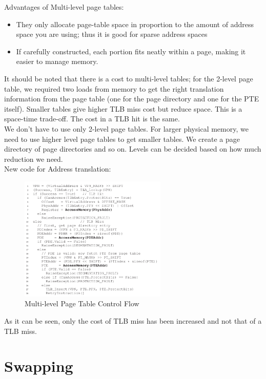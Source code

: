 Advantages of Multi-level page tables:

\begin{itemize}
    \item They only allocate page-table space in proportion to the amount of
        address space you are using; thus it is good for sparse address
        spaces
    \item If carefully constructed, each portion fits neatly within a page,
        making it easier to manage memory.
\end{itemize}

It should be noted that there is a cost to multi-level tables; for the
2-level page table, we required two loads from memory to get the right
translation information from the page table (one for the page directory and
one for the PTE itself). Smaller tables 
give higher TLB miss cost but reduce space.
This is a space-time trade-off. The cost in a TLB hit is the same.\\

We don't have to use only 2-level page tables. For larger physical memory, 
we need to use higher level page tables to get smaller tables. We create a
page directory of page directories and so on. Levels can be decided based on
how much reduction we need.\\

New code for Address translation:

\begin{figure}[h!]
    \begin{center}
        \includegraphics[width=7cm]{img/206.png}
        \caption{Multi-level Page Table Control Flow}
    \end{center}
\end{figure}

As it can be seen, only the cost of TLB miss has been increased and not that
of a TLB miss.


\section{Swapping}

